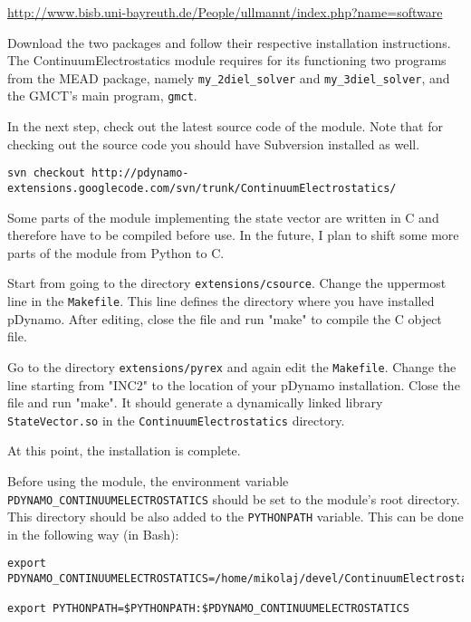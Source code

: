 \documentclass[a4paper,11pt]{article}
\newcommand{\modulename}{ContinuumElectrostatics\xspace}
\begin{document}
\url{http://www.bisb.uni-bayreuth.de/People/ullmannt/index.php?name=software}

Download the two packages and follow their respective installation
instructions.
%
The \modulename module requires for its functioning two programs
from the MEAD package, namely \texttt{my\_2diel\_solver} and \texttt{my\_3diel\_solver},
and the GMCT's main program, \texttt{gmct}.

\bigskip
In the next step, check out the latest source code of the module.
%
Note that for checking out the source code you should have Subversion installed
as well.

{\footnotesize \begin{lstlisting}
svn checkout http://pdynamo-extensions.googlecode.com/svn/trunk/ContinuumElectrostatics/
\end{lstlisting} }

\bigskip
Some parts of the module implementing the state vector are written in C and
therefore have to be compiled before use. 
%
In the future, I plan to shift some more parts of the module from Python to C.

\bigskip
Start from going to the directory \texttt{extensions/csource}.
%
Change the uppermost line in the \texttt{Makefile}. 
%
This line defines the directory where you have installed pDynamo. 
%
After editing, close the file and run "make" to compile the C object file.

\bigskip
Go to the directory \texttt{extensions/pyrex} and again edit the \texttt{Makefile}.
%
Change the line starting from "INC2" to the location of your pDynamo installation.
%
Close the file and run "make".
%
It should generate a dynamically linked library \texttt{StateVector.so} in 
the \texttt{ContinuumElectrostatics} directory.

\bigskip
At this point, the installation is complete.

\bigskip
Before using the module, the environment variable \texttt{PDYNAMO\_CONTINUUMELECTROSTATICS} 
should be set to the module's root directory.
%
This directory should be also added to the \texttt{PYTHONPATH} variable. 
%
This can be done in the following way (in Bash):

\newpage
{\footnotesize \begin{lstlisting}
export PDYNAMO_CONTINUUMELECTROSTATICS=/home/mikolaj/devel/ContinuumElectrostatics

export PYTHONPATH=$PYTHONPATH:$PDYNAMO_CONTINUUMELECTROSTATICS
\end{lstlisting} }
\end{document}
